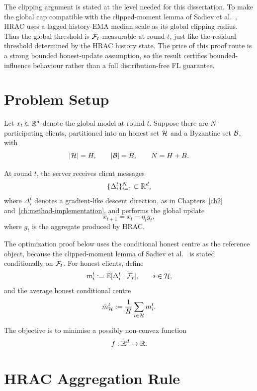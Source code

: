 The clipping argument is stated at the level needed for this dissertation. To
make the global cap compatible with the clipped-moment lemma of Sadiev
et al.~\cite{sadiev2023highprob}, HRAC uses a lagged history-EMA median scale
as its global clipping radius. Thus the global threshold is
\(\mathcal{F}_t\)-measurable at round \(t\), just like the residual threshold determined
by the HRAC history state. The price of this proof route is a strong bounded
honest-update assumption, so the result certifies bounded-influence behaviour
rather than a full distribution-free FL guarantee.

\section{Problem Setup}

Let \(x_t \in \mathbb{R}^d\) denote the global model at round \(t\).
Suppose there are \(N\) participating clients, partitioned into an honest set
\(\mathcal{H}\) and a Byzantine set \(\mathcal{B}\), with
\[
    |\mathcal{H}| = H, \qquad |\mathcal{B}| = B, \qquad N = H + B.
\]

At round \(t\), the server receives client messages
\[
    \{\Delta_i^t\}_{i=1}^N \subset \mathbb{R}^d,
\]
where \(\Delta_i^t\) denotes a gradient-like descent direction, as in
Chapters~\ref{ch2} and~\ref{ch:method-implementation},
and performs the global update
\begin{equation}
    x_{t+1} = x_t - \eta_t g_t,
    \label{eq:server_update}
\end{equation}
where \(g_t\) is the aggregate produced by HRAC.

The optimization proof below uses the conditional honest centre as the
reference object, because the clipped-moment lemma of
Sadiev et al.~\cite[Lemma~5.1]{sadiev2023highprob} is stated conditionally on
\(\mathcal{F}_t\). For honest clients, define
\begin{equation}
    m_i^t:=\mathbb{E}[\Delta_i^t\mid\mathcal{F}_t],
    \qquad i\in\mathcal{H},
    \label{eq:honest_conditional_centre}
\end{equation}
and the average honest conditional centre
\begin{equation}
    \bar m_{\mathcal{H}}^t
    :=
    \frac1H\sum_{i\in\mathcal{H}}m_i^t.
    \label{eq:honest_centre_average}
\end{equation}

The objective is to minimise a possibly non-convex function
\[
    f : \mathbb{R}^d \to \mathbb{R}.
\]

\section{HRAC Aggregation Rule}

